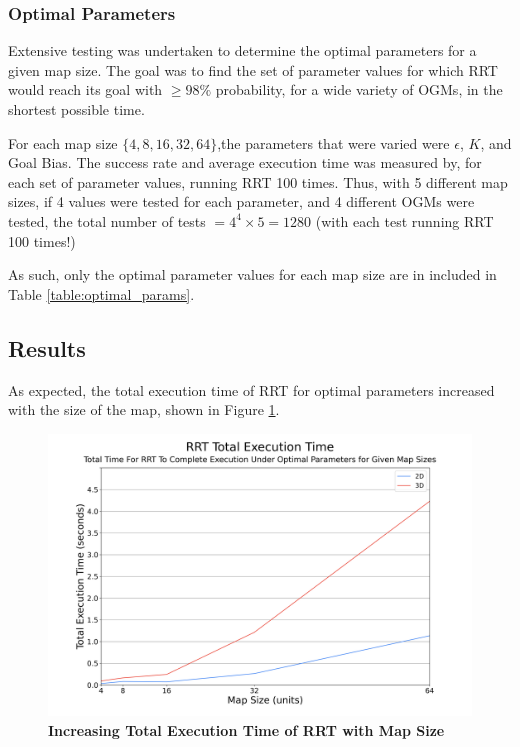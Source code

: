     \subsubsection{Optimal Parameters}
    \label{section:rrt_optimal_params}
        Extensive testing was undertaken to determine the optimal parameters for a given map size. The goal was to find the set of parameter values for which \gls{RRT} would reach its goal with $\geq98\%$ probability, for a wide variety of \glspl{OGM}, in the shortest possible time. 

        For each map size $\{4, 8, 16, 32, 64\}$,the parameters that were varied were $\epsilon$, $K$, and Goal Bias. The success rate and average execution time was measured by, for each set of parameter values, running \gls{RRT} 100 times. Thus, with 5 different map sizes, if 4 values were tested for each parameter, and 4 different \glspl{OGM} were tested, the total number of tests $= 4^4 \times 5 = 1280$ (with each test running \gls{RRT} 100 times!)

        As such, only the optimal parameter values for each map size are in included in Table \ref{table:optimal_params}.

        

\subsection{Results}
\label{section:rrt_analysis_results}
    As expected, the total execution time of \gls{RRT} for optimal parameters increased with the size of the map, shown in Figure \ref{fig:rrt_profiling_timing}.

    \begin{figure}[H]
    \begin{centering}
    \includegraphics[width=0.65\linewidth]{chapters/chapter2/img/profiling/timing.png}
    \caption[Increasing Total Execution Time of RRT with Map Size]{\textbf{Increasing Total Execution Time of RRT with Map Size}}
    \label{fig:rrt_profiling_timing}
    \end{centering}
    \end{figure}
    
